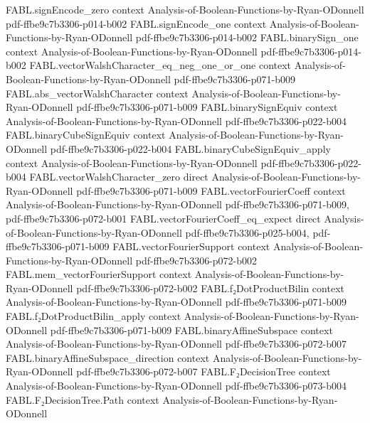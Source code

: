 \begin{theorem}
  {FABL.signEncode_zero}
  {context}
  {Analysis-of-Boolean-Functions-by-Ryan-ODonnell}
  {pdf-ffbe9c7b3306-p014-b002}
\proofstep
  {FABL.signEncode_one}
  {context}
  {Analysis-of-Boolean-Functions-by-Ryan-ODonnell}
  {pdf-ffbe9c7b3306-p014-b002}
\proofstep
  {FABL.binarySign_one}
  {context}
  {Analysis-of-Boolean-Functions-by-Ryan-ODonnell}
  {pdf-ffbe9c7b3306-p014-b002}
\proofstep
  {FABL.vectorWalshCharacter_eq_neg_one_or_one}
  {context}
  {Analysis-of-Boolean-Functions-by-Ryan-ODonnell}
  {pdf-ffbe9c7b3306-p071-b009}
\proofstep
  {FABL.abs_vectorWalshCharacter}
  {context}
  {Analysis-of-Boolean-Functions-by-Ryan-ODonnell}
  {pdf-ffbe9c7b3306-p071-b009}
\proofstep
  {FABL.binarySignEquiv}
  {context}
  {Analysis-of-Boolean-Functions-by-Ryan-ODonnell}
  {pdf-ffbe9c7b3306-p022-b004}
\proofstep
  {FABL.binaryCubeSignEquiv}
  {context}
  {Analysis-of-Boolean-Functions-by-Ryan-ODonnell}
  {pdf-ffbe9c7b3306-p022-b004}
\proofstep
  {FABL.binaryCubeSignEquiv_apply}
  {context}
  {Analysis-of-Boolean-Functions-by-Ryan-ODonnell}
  {pdf-ffbe9c7b3306-p022-b004}
\proofstep
  {FABL.vectorWalshCharacter_zero}
  {direct}
  {Analysis-of-Boolean-Functions-by-Ryan-ODonnell}
  {pdf-ffbe9c7b3306-p071-b009}
\proofstep
  {FABL.vectorFourierCoeff}
  {context}
  {Analysis-of-Boolean-Functions-by-Ryan-ODonnell}
  {pdf-ffbe9c7b3306-p071-b009,
    pdf-ffbe9c7b3306-p072-b001}
\proofstep
  {FABL.vectorFourierCoeff_eq_expect}
  {direct}
  {Analysis-of-Boolean-Functions-by-Ryan-ODonnell}
  {pdf-ffbe9c7b3306-p025-b004,
    pdf-ffbe9c7b3306-p071-b009}
\proofstep
  {FABL.vectorFourierSupport}
  {context}
  {Analysis-of-Boolean-Functions-by-Ryan-ODonnell}
  {pdf-ffbe9c7b3306-p072-b002}
\proofstep
  {FABL.mem_vectorFourierSupport}
  {context}
  {Analysis-of-Boolean-Functions-by-Ryan-ODonnell}
  {pdf-ffbe9c7b3306-p072-b002}
\proofstep
  {FABL.f₂DotProductBilin}
  {context}
  {Analysis-of-Boolean-Functions-by-Ryan-ODonnell}
  {pdf-ffbe9c7b3306-p071-b009}
\proofstep
  {FABL.f₂DotProductBilin_apply}
  {context}
  {Analysis-of-Boolean-Functions-by-Ryan-ODonnell}
  {pdf-ffbe9c7b3306-p071-b009}
\proofstep
  {FABL.binaryAffineSubspace}
  {context}
  {Analysis-of-Boolean-Functions-by-Ryan-ODonnell}
  {pdf-ffbe9c7b3306-p072-b007}
\proofstep
  {FABL.binaryAffineSubspace_direction}
  {context}
  {Analysis-of-Boolean-Functions-by-Ryan-ODonnell}
  {pdf-ffbe9c7b3306-p072-b007}
\proofstep
  {FABL.F₂DecisionTree}
  {context}
  {Analysis-of-Boolean-Functions-by-Ryan-ODonnell}
  {pdf-ffbe9c7b3306-p073-b004}
\proofstep
  {FABL.F₂DecisionTree.Path}
  {context}
  {Analysis-of-Boolean-Functions-by-Ryan-ODonnell}

\end{theorem}
